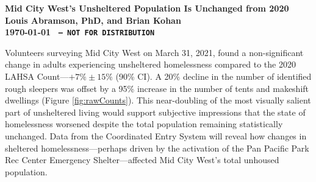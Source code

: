 \documentclass[11pt]{article}
\def\bfr{\bf\color{red}}
\begin{document}

\begin{center}
	\Large\bf Mid City West's Unsheltered Population Is Unchanged from 2020\\
	\vspace{1ex}
	{\normalsize\rm Louis Abramson, PhD, and Brian Kohan\\ \today 
	}{\bfr \texttt{ -- NOT FOR DISTRIBUTION}}
\end{center}

 Volunteers surveying Mid City West on March 31, 2021, found  
a non-significant change in adults experiencing unsheltered homelessness compared to the 2020 
LAHSA Count---$+7\%\pm15\%$ (90\% CI). A 20\% decline in the number of identified rough 
sleepers was offset by a 95\% increase in the number of tents and makeshift dwellings 
(Figure \ref{fig:rawCounts}). This near-doubling of the most visually salient part of unsheltered 
living would support subjective impressions that the state of homelessness worsened despite the 
total population remaining statistically unchanged. Data from the Coordinated Entry System will 
reveal how changes in sheltered homelessness---perhaps driven by the activation of the Pan Pacific 
Park Rec Center Emergency Shelter---affected Mid City West's total unhoused population.

\begin{table}[h]
\caption{Mid City West 2021 Unsheltered Counts and Population Estimates}
\caption*{*Neither the change in raw counts or inferred population is statistically significant (parentheses 
denote 90\% uncertainties). No transition age youth, minors, or families were sighted.}
\label{tbl:summary}
\end{table}
\end{document}
